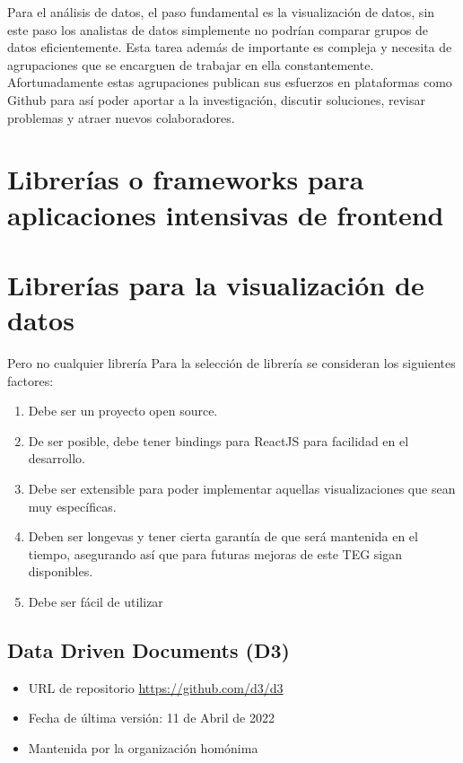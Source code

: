 Para el análisis de datos, el paso fundamental es la visualización de datos, sin este paso los analistas de datos simplemente no podrían comparar grupos de datos 
eficientemente. 
Esta tarea además de importante es compleja y necesita de agrupaciones que se encarguen de trabajar en ella constantemente. Afortunadamente estas agrupaciones publican sus esfuerzos en plataformas como Github para así poder aportar a la investigación, discutir soluciones, revisar problemas y atraer nuevos colaboradores.

\section{Librerías o frameworks para aplicaciones intensivas de frontend}

\section{Librerías para la visualización de datos}
Pero no cualquier librería 
Para la selección de librería se consideran los siguientes factores:

\begin{enumerate}
    \item {Debe ser un proyecto open source.}
    \item {De ser posible, debe tener bindings para ReactJS para facilidad en el desarrollo.}
    \item {Debe ser extensible para poder implementar aquellas visualizaciones que sean muy específicas.}
    \item {Deben ser longevas y tener cierta garantía de que será mantenida en el tiempo,
    asegurando así que para futuras mejoras de este TEG sigan disponibles.}
    \item {Debe ser fácil de utilizar}
\end{enumerate}

\subsection{ Data Driven Documents (D3) }
\begin{itemize}
    \item URL de repositorio \href{https://github.com/d3/d3}{https://github.com/d3/d3}
    \item Fecha de última versión: 11 de Abril de 2022
    \item Mantenida por la organización homónima
\end{itemize}

